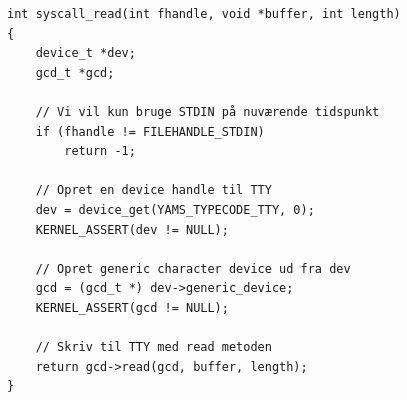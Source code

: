 \documentclass[11pt]{article}
\begin{document}
\begin{lstlisting}[style=customc]
int syscall_read(int fhandle, void *buffer, int length)
{
    device_t *dev;
    gcd_t *gcd;

    // Vi vil kun bruge STDIN på nuværende tidspunkt
    if (fhandle != FILEHANDLE_STDIN)
        return -1;

    // Opret en device handle til TTY
    dev = device_get(YAMS_TYPECODE_TTY, 0);
    KERNEL_ASSERT(dev != NULL);

    // Opret generic character device ud fra dev
    gcd = (gcd_t *) dev->generic_device;
    KERNEL_ASSERT(gcd != NULL);

    // Skriv til TTY med read metoden
    return gcd->read(gcd, buffer, length);
}
\end{lstlisting}
\end{document}

